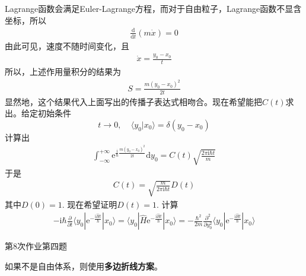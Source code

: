         Lagrange函数会满足Euler-Lagrange方程，而对于自由粒子，Lagrange函数不显含坐标，所以
        \begin{equation}\begin{aligned}
            \frac {\mathrm{d}}{\mathrm{d}t} (m \dot x) = 0
        \end{aligned}\end{equation}
        由此可见，速度不随时间变化，且
        \begin{equation}\begin{aligned}
            \dot{x} = \frac {y_0-x_0}t
        \end{aligned}\end{equation}
        所以，上述作用量积分的结果为
        \begin{equation}\begin{aligned}
            S = \frac {m(y_0 - x_0)^2}{2t}
        \end{aligned}\end{equation}
        显然地，这个结果代入上面写出的传播子表达式相吻合。现在希望能把$C(t)$求出。给定初始条件
        \begin{equation}
            t \to 0,~~~~~\langle y_0|x_0\rangle = \delta(y_0-x_0)
        \end{equation}
        计算出
        \begin{equation}\begin{aligned}
            \int_{-\infty}^{+\infty} \mathrm{e}^{\frac {\mathrm{i}}{\hbar} \frac {m(y_0 - x_0)^2}{2t}}\mathrm{d}y_0 = C(t) \sqrt{\frac {2\pi\mathrm{i}\hbar t}m}
        \end{aligned}\end{equation}
        于是 
        \begin{equation}\begin{aligned}
            C(t) = \sqrt{\frac m{2\pi\mathrm{i}\hbar t}} D(t)
        \end{aligned}\end{equation}
        其中$D(0) = 1$. 现在希望证明$D(t) = 1$.
        计算
        \begin{equation}\begin{aligned}
            -\mathrm{i}\hbar \frac {\partial}{\partial t} \langle y_0 | \mathrm{e}^{-\frac {\mathrm{i}\hat{H}t}{\hbar}} |x_0 \rangle =  \langle y_0 | \hat{H} \mathrm{e}^{-\frac {\mathrm{i}\hat{H}t}{\hbar}} |x_0 \rangle
            = -\frac {\hbar^2}{2m} \frac {\partial^2}{\partial y_0^2} \langle y_0 | \mathrm{e}^{-\frac {\mathrm{i}\hat{H}t}{\hbar}} |x_0 \rangle
        \end{aligned}\end{equation}
        \begin{asg}
            第8次作业第四题
        \end{asg}
        如果不是自由体系，则使用\textbf{多边折线方案}。

